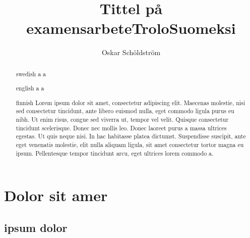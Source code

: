 \documentclass[twoside,emptyfirstpagenumber,swedish]{../thesis}
\begin{document}

\title{Tittel på examensarbete}
\author{Oskar Schöldström}
\date{\the\year}


\maketitle


\begin{abstract}{swedish}
a  a \\
\end{abstract}

\title{Trolo}
\begin{abstract}{english}
a  a \\
\end{abstract}

\title{Suomeksi}
\begin{abstract}{finnish}
Lorem ipsum dolor sit amet, consectetur adipiscing elit. Maecenas molestie, nisi sed consectetur tincidunt, ante libero euismod nulla, eget commodo ligula purus eu nibh. Ut enim risus, congue sed viverra ut, tempor vel velit. Quisque consectetur tincidunt scelerisque. Donec nec mollis leo. Donec laoreet purus a massa ultrices egestas. Ut quis neque nisi. In hac habitasse platea dictumst. Suspendisse suscipit, ante eget venenatis molestie, elit nulla aliquam ligula, sit amet consectetur tortor magna eu ipsum. Pellentesque tempor tincidunt arcu, eget ultrices lorem commodo a.
\end{abstract}


\tableofcontents

\listoftables

\listoffigures


\section{Dolor sit amer}

\subsection{ipsum dolor}
\end{document}
